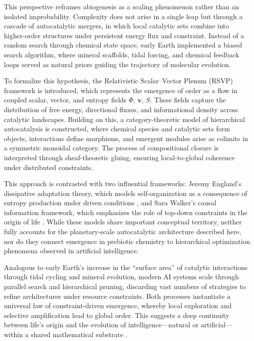 \documentclass[openany]{book}
\begin{document}
This perspective reframes abiogenesis as a scaling phenomenon rather than an isolated improbability. Complexity does not arise in a single leap but through a cascade of autocatalytic mergers, in which local catalytic sets combine into higher-order structures under persistent energy flux and constraint. Instead of a random search through chemical state space, early Earth implemented a biased search algorithm, where mineral scaffolds, tidal forcing, and chemical feedback loops served as natural priors guiding the trajectory of molecular evolution.

To formalize this hypothesis, the Relativistic Scalar–Vector Plenum (RSVP) framework is introduced, which represents the emergence of order as a flow in coupled scalar, vector, and entropy fields $\Phi$, $\mathbf{v}$, $S$. These fields capture the distribution of free energy, directional fluxes, and informational density across catalytic landscapes. Building on this, a category-theoretic model of hierarchical autocatalysis is constructed, where chemical species and catalytic sets form objects, interactions define morphisms, and emergent modules arise as colimits in a symmetric monoidal category. The process of compositional closure is interpreted through sheaf-theoretic gluing, ensuring local-to-global coherence under distributed constraints.

This approach is contrasted with two influential frameworks: Jeremy England’s dissipative adaptation theory, which models self-organization as a consequence of entropy production under driven conditions \citep{england2013,england2015}, and Sara Walker’s causal information framework, which emphasizes the role of top-down constraints in the origin of life \citep{walker2013,walker2017}. While these models share important conceptual territory, neither fully accounts for the planetary-scale autocatalytic architecture described here, nor do they connect emergence in prebiotic chemistry to hierarchical optimization phenomena observed in artificial intelligence.

Analogous to early Earth’s increase in the “surface area” of catalytic interactions through tidal cycling and mineral evolution, modern AI systems scale through parallel search and hierarchical pruning, discarding vast numbers of strategies to refine architectures under resource constraints. Both processes instantiate a universal law of constraint-driven emergence, whereby local exploration and selective amplification lead to global order. This suggests a deep continuity between life’s origin and the evolution of intelligence—natural or artificial—within a shared mathematical substrate \citep{day2024, scalinghypothesis}.
\end{document}
